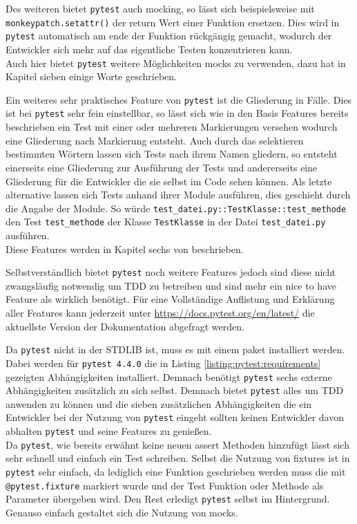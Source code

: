 Des weiteren bietet \lstinline{pytest} auch \gls{mock}ing, so lässt sich beispielsweise mit
\lstinline{monkeypatch.setattr()} der return Wert einer Funktion ersetzen. Dies wird
in \lstinline{pytest} automatisch am ende der Funktion rückgängig gemacht, wodurch der Entwickler
sich mehr auf das eigentliche Testen konzentrieren kann.
\newline
\\
Auch hier bietet \lstinline{pytest} weitere Möglichkeiten \Glspl{mock} zu verwenden, dazu hat
\cite{docs.pytest.org:4.4} in Kapitel sieben einige Worte geschrieben.

Ein weiteres sehr praktisches Feature von \lstinline{pytest} ist die Gliederung in Fälle. Dies ist bei \lstinline{pytest}
sehr fein einstellbar, so lässt sich wie in den Basis Features bereits beschrieben ein Test mit
einer oder mehreren Markierungen versehen wodurch eine Gliederung nach Markierung entsteht. Auch
durch das selektieren bestimmten Wörtern lassen sich Tests nach ihrem Namen gliedern, so entsteht
einerseits eine Gliederung zur Ausführung der Tests und andererseits eine Gliederung für die
Entwickler die sie selbst im Code sehen können. Als letzte alternative lassen sich Tests anhand
ihrer Module ausführen, dies geschieht durch die Angabe der Module. So würde
\lstinline{test_datei.py::TestKlasse::test_methode} den Test \lstinline{test_methode} der Klasse
\lstinline{TestKlasse} in der Datei \lstinline{test_datei.py} ausführen.
\newline
\\
Diese Features werden in Kapitel sechs von \cite{docs.pytest.org:4.4} beschrieben.

Selbstverständlich bietet \lstinline{pytest} noch weitere Features jedoch sind diese nicht zwangsläufig notwendig
um TDD zu betreiben und sind mehr ein nice to have Feature als wirklich benötigt. Für eine
Vollständige Auflistung und Erklärung aller Features kann jederzeit unter
\url{https://docs.pytest.org/en/latest/} die aktuellste Version der Dokumentation abgefragt werden.

Da \lstinline{pytest} nicht in der STDLIB ist, muss es mit einem \Gls{paket} installiert werden.
Dabei werden für \lstinline{pytest 4.4.0} die in Listing \ref{listing:pytest:requirements}
gezeigten Abhängigkeiten installiert. Demnach benötigt \lstinline{pytest} sechs externe Abhängigkeiten
zusätzlich zu sich selbst.
Demnach bietet \lstinline{pytest} alles um TDD anwenden zu können und die sieben zusätzlichen Abhängigkeiten
die ein Entwickler bei der Nutzung von \lstinline{pytest} eingeht sollten keinen Entwickler davon abhalten
\lstinline{pytest} und seine Features zu genießen.
\newline
\\
Da \lstinline{pytest}, wie bereits erwähnt keine neuen assert Methoden hinzufügt lässt sich sehr schnell und
einfach ein Test schreiben. Selbst die Nutzung von \Glspl{fixture} ist in \lstinline{pytest} sehr einfach, da
lediglich eine Funktion geschrieben werden muss die mit \lstinline{@pytest.fixture} markiert wurde
und der Test Funktion oder Methode als Parameter übergeben wird. Den Rest erledigt \lstinline{pytest} selbst
im Hintergrund. Genauso einfach gestaltet sich die Nutzung von \Glspl{mock}.

